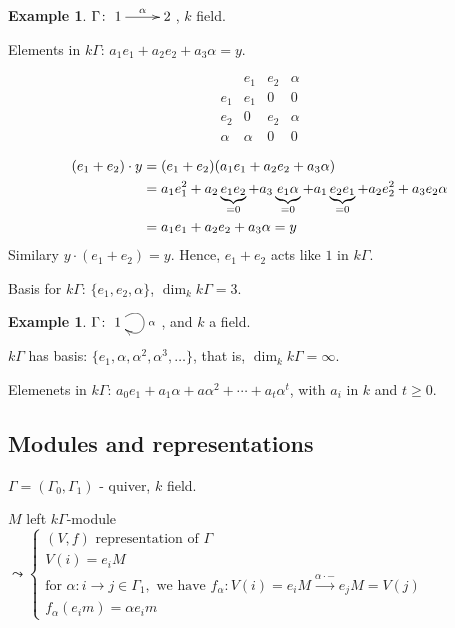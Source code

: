 \documentclass{amsart}
\numberwithin{equation}{section}
\theoremstyle{definition}
\newtheorem{exam}[thm]{Example}
\newcommand{\extto}{\xrightarrow}
\begin{document}
\begin{exam}
$\Gamma\colon \xymatrix{1\ar[r]^\alpha & 2}$, $k$ field.  

Elements in $k\Gamma$:  $a_1e_1 + a_2e_2 + a_3\alpha = y$. 

\[\begin{array}{c||c|c|c}
      & e_1 & e_2 & \alpha \\ \hline\hline 
e_1 & e_1 &  0   &    0   \\ \hline
e_2 &   0   & e_2 &  \alpha \\ \hline
\alpha & \alpha & 0 & 0
\end{array}\]
\end{exam}
\begin{align}
(e_1 + e_2)\cdot y & = (e_1 + e_2)(a_1e_1 + a_2e_2 +
                     a_3\alpha)\notag\\
& = a_1e_1^2 + a_2\underbrace{e_1e_2}_{=0} + a_3\underbrace{e_1\alpha}_{=0} + a_1\underbrace{e_2e_1}_{=0} + a_2e_2^2 + a_3
  e_2\alpha\notag\\
& = a_1e_1 + a_2e_2 + a_3\alpha = y\notag
\end{align} 
Similary $y\cdot (e_1 + e_2) = y$.  Hence,  $e_1 + e_2$ acts like $1$
in $k\Gamma$. 

Basis for $k\Gamma$: $\{ e_1, e_2, \alpha\}$, $\dim_kk\Gamma = 3$.

\begin{exam}
$\Gamma\colon \xymatrix{1\ar@(ur,dr)[]^\alpha}$, and $k$ a field.

$k\Gamma$ has basis: $\{e_1, \alpha, \alpha^2, \alpha^3, \ldots\}$,
that is, $\dim_k k\Gamma = \infty$. 

Elemenets in $k\Gamma$: $a_0e_1 + a_1\alpha + a\alpha^2 + \cdots +
a_t\alpha^t$, with $a_i$ in $k$ and $t\geqslant 0$.  
\end{exam}


\subsection{Modules and representations}

$\Gamma = (\Gamma_0,\Gamma_1)$ - quiver, $k$ field.

$M$ left $k\Gamma$-module $\leadsto\begin{cases}
(V,f) \text{\ representation of $\Gamma$}\\
V(i) = e_iM\\
\text{for\ } \alpha\colon i\to j \in \Gamma_1, \text{\ we have\ }  f_\alpha\colon
V(i)=e_iM\extto{\alpha\cdot -} e_jM = V(j)\\
f_\alpha(e_im) = \alpha e_im
\end{cases}$
\end{document}

